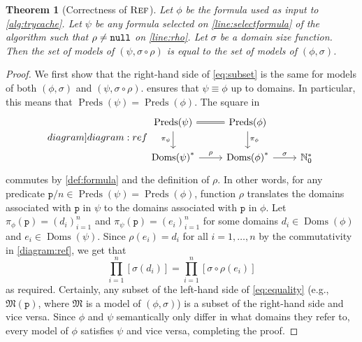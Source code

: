 \documentclass{article}
\newtheorem{theorem}{Theorem}
\theoremstyle{definition}
\DeclareMathOperator{\Reff}{\textsc{Ref}}
\DeclareMathOperator{\Doms}{Doms}
\DeclareMathOperator{\Preds}{Preds}
\begin{document}
\begin{theorem}[Correctness of $\Reff$]
  Let $\phi$ be the formula used as input to \cref{alg:trycache}. Let $\psi$ be
  any formula selected on \cref{line:selectformula} of the algorithm such that
  $\rho \ne {\normalfont\texttt{null}}$ on \cref{line:rho}. Let $\sigma$ be a
  domain size function. Then the set of models of $(\psi, \sigma \circ \rho)$ is
  equal to the set of models of $(\phi, \sigma)$.
\end{theorem}
\begin{proof}
  We first show that the right-hand side of \cref{eq:subset} is the same for
  models of both $(\phi, \sigma)$ and $(\psi, \sigma \circ \rho)$.
   ensures that $\psi \equiv \phi$ up to domains. In
  particular, this means that $\Preds(\psi) = \Preds(\phi)$. The square in
  \begin{equation}\label[diagram]{diagram:ref}
    \begin{tikzcd}
      \Preds(\psi) \ar[equal]{r} \ar[d, swap, "\pi_{\psi}"] & \Preds(\phi) \ar[d, "\pi_{\phi}"] \\
      {\Doms(\psi)}^{\ast} \ar[r, "\rho"] & {\Doms(\phi)}^{\ast} \ar[r, "\sigma"] & \mathbb{N}_{0}^{\ast}
    \end{tikzcd}
  \end{equation}
  commutes by \cref{def:formula} and the definition of $\rho$. In other words,
  for any predicate $\texttt{p}/n \in \Preds(\psi) = \Preds(\phi)$, function
  $\rho$ translates the domains associated with $\texttt{p}$ in $\psi$ to the
  domains associated with $\texttt{p}$ in $\phi$. Let
  $\pi_{\phi}(\texttt{p}) = {(d_{i})}_{i=1}^{n}$ and
  $\pi_{\psi}(\texttt{p}) = {(e_{i})}_{i=1}^{n}$ for some domains
  $d_{i} \in \Doms(\phi)$ and $e_{i} \in \Doms(\psi)$. Since
  $\rho(e_{i}) = d_{i}$ for all $i = 1, \dots, n$ by the commutativity in
  \cref{diagram:ref}, we get that
  \begin{equation}\label{eq:equality}
    \prod_{i=1}^{n}[\sigma(d_{i})] = \prod_{i=1}^{n}[\sigma \circ \rho(e_{i})]
  \end{equation}
  as required. Certainly, any subset of the left-hand side of \cref{eq:equality}
  (e.g., $\mathfrak{M}(\texttt{p})$, where $\mathfrak{M}$ is a model of
  $(\phi, \sigma)$) is a subset of the right-hand side and vice versa. Since
  $\phi$ and $\psi$ semantically only differ in what domains they refer to,
  every model of $\phi$ satisfies $\psi$ and vice versa, completing the proof.
\end{proof}
\end{document}
